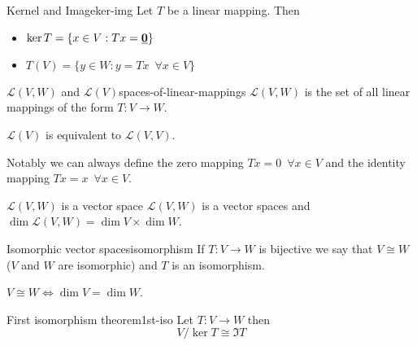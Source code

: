 \documentclass[12pt]{extarticle}
\renewcommand{\vec}[1]{\uvec{#1}}
\begin{document}
\begin{definition}{Kernel and Image}{ker-img}
    Let $T$ be a linear mapping. Then
    \begin{itemize}
        \item $\ker T = \{ x \in V : Tx = \vec 0 \}$
        \item $T(V) = \{ y \in W : y = Tx \enspace \forall x \in V \}$
    \end{itemize}
\end{definition}

\begin{definition}{$\mathscr{L}(V, W)$ and $\mathscr{L}(V)$}{spaces-of-linear-mappings}
    $\mathscr{L}(V, W)$ is the set of all linear mappings of the form $T: V \to W$.

    $\mathscr{L}(V)$ is equivalent to $\mathscr{L}(V, V)$.
\end{definition}

Notably we can always define the zero mapping $Tx = 0 \enspace \forall x \in V$ and the identity mapping $Tx = x \enspace \forall x \in V$.

\begin{theorem}{$\mathscr{L}(V, W)$ is a vector space}{}
    $\mathscr{L}(V, W)$ is a vector spaces and $\dim \mathscr{L}(V, W) = \dim V \times \dim W$.
\end{theorem}

\begin{definition}{Isomorphic vector spaces}{isomorphism}
    If $T: V\to W$ is bijective we say that $V \cong W$ ($V$ and $W$ are isomorphic) and $T$ is an isomorphism.
\end{definition}

\begin{proposition}{}{}
    $V \cong W \iff \dim V = \dim W$.
\end{proposition}

\begin{theorem}{First isomorphism theorem}{1st-iso}
    Let $T: V \to W$ then
    \begin{equation}
        V/\ker T \cong \Im T
    \end{equation}
\end{theorem}
\end{document}
